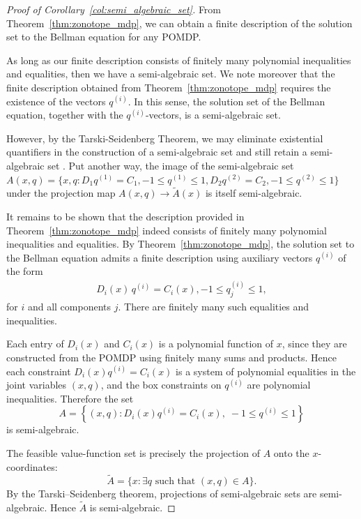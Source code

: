 \documentclass{article}
\theoremstyle{definition}
\theoremstyle{remark}
\begin{document}
\semialgebraicset* 

\begin{proof}[Proof of Corollary~\ref{col:semi_algebraic_set}] 
    \label{proof:semi_algebraic}
    From Theorem~\ref{thm:zonotope_mdp}, we can obtain a finite description of the solution set to the Bellman equation for any POMDP. 
    
    As long as our finite description consists of finitely many polynomial inequalities and equalities, then we have a semi-algebraic set. 
    We note moreover that the finite description obtained from Theorem~\ref{thm:zonotope_mdp} requires the existence of the vectors $q^{(i)}$. 
    In this sense, the solution set of the Bellman equation, together with the $q^{(i)}$-vectors, is a semi-algebraic set. 

    However, by the Tarski-Seidenberg Theorem, we may eliminate existential quantifiers in the construction of a semi-algebraic set and still retain a semi-algebraic set \citep{drtonSullivantAlgebraic2007}. 
    Put another way, the image of the semi-algebraic set $A(x, q) = \{ x, q: D_1q^{(1)} = C_1, -1 \leq q^{(1)} \leq 1, D_2q^{(2)} = C_2, -1 \leq q^{(2)} \leq 1\}$ under the projection map $A(x, q) \to \tilde{A}(x)$ is itself semi-algebraic. 

    It remains to be shown that the description provided in Theorem~\ref{thm:zonotope_mdp} indeed consists of finitely many polynomial inequalities and equalities. 
%
    By Theorem~\ref{thm:zonotope_mdp}, the solution set to the Bellman equation admits a finite description using auxiliary vectors $q^{(i)}$ of the form
    \begin{align*}
        D_i(x)\, q^{(i)} = C_i(x), -1 \le q^{(i)}_j \le 1,        
    \end{align*}
    for $i$ and all components $j$. 
    There are finitely many such equalities and inequalities.

    Each entry of $D_i(x)$ and $C_i(x)$ is a polynomial function of $x$, since they are constructed from the POMDP using finitely many sums and products. Hence each constraint $D_i(x) q^{(i)} = C_i(x)$ is a system of polynomial equalities in the joint variables $(x,q)$, and the box constraints on $q^{(i)}$ are polynomial inequalities. Therefore the set
    $$
    A 
    = \left\{(x,q): D_i(x) q^{(i)} = C_i(x),\;  -1 \le q^{(i)} \le 1 \right\}
    $$
    is semi-algebraic. 

    The feasible value-function set is precisely the projection of $A$ onto the $x$-coordinates:
    $$
    \tilde A 
    = \{x : \exists q \text{ such that } (x,q)\in A\}.
    $$
    By the Tarski–Seidenberg theorem, projections of semi-algebraic sets are semi-algebraic. Hence $\tilde A$ is semi-algebraic.
\end{proof}
\end{document}
